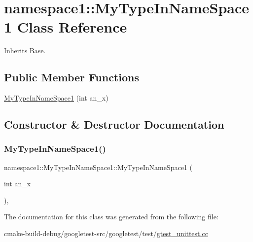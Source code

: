 \hypertarget{classnamespace1_1_1MyTypeInNameSpace1}{}\section{namespace1\+::My\+Type\+In\+Name\+Space1 Class Reference}
\label{classnamespace1_1_1MyTypeInNameSpace1}


Inherits Base.

\subsection*{Public Member Functions}
\begin{DoxyCompactItemize}
\item 
\mbox{\hyperlink{classnamespace1_1_1MyTypeInNameSpace1_a2e4277aa118e9b83045a18392188a0d8}{My\+Type\+In\+Name\+Space1}} (int an\+\_\+x)
\end{DoxyCompactItemize}


\subsection{Constructor \& Destructor Documentation}
\mbox{\label{classnamespace1_1_1MyTypeInNameSpace1_a2e4277aa118e9b83045a18392188a0d8}} 
\subsubsection{\texorpdfstring{MyTypeInNameSpace1()}{MyTypeInNameSpace1()}}
{\footnotesize\ttfamily namespace1\+::\+My\+Type\+In\+Name\+Space1\+::\+My\+Type\+In\+Name\+Space1 (\begin{DoxyParamCaption}\item[{int}]{an\+\_\+x }\end{DoxyParamCaption})\hspace{0.3cm}{\ttfamily [inline]}, {\ttfamily [explicit]}}



The documentation for this class was generated from the following file\+:\begin{DoxyCompactItemize}
\item 
cmake-\/build-\/debug/googletest-\/src/googletest/test/\mbox{\hyperlink{gtest__unittest_8cc}{gtest\+\_\+unittest.\+cc}}\end{DoxyCompactItemize}
